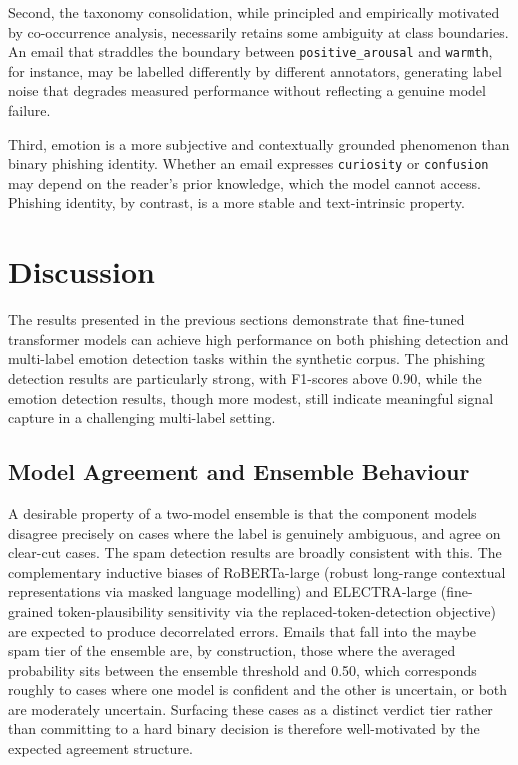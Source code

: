 Second, the taxonomy consolidation, while principled and empirically motivated by co-occurrence analysis, necessarily retains some ambiguity at class boundaries. An email that straddles the boundary between \texttt{positive\_arousal} and \texttt{warmth}, for instance, may be labelled differently by different annotators, generating label noise that degrades measured performance without reflecting a genuine model failure.

Third, emotion is a more subjective and contextually grounded phenomenon than binary phishing identity. Whether an email expresses \texttt{curiosity} or \texttt{confusion} may depend on the reader's prior knowledge, which the model cannot access. Phishing identity, by contrast, is a more stable and text-intrinsic property.

\section{Discussion}
\label{sec:results_discussion}

The results presented in the previous sections demonstrate that fine-tuned transformer models can achieve high performance on both phishing detection and multi-label emotion detection tasks within the synthetic corpus. The phishing detection results are particularly strong, with F1-scores above 0.90, while the emotion detection results, though more modest, still indicate meaningful signal capture in a challenging multi-label setting.

\subsection{Model Agreement and Ensemble Behaviour}

A desirable property of a two-model ensemble is that the component models disagree precisely on cases where the label is genuinely ambiguous, and agree on clear-cut cases. The spam detection results are broadly consistent with this. The complementary inductive biases of \acs{RoBERTa}-large (robust long-range contextual representations via masked language modelling) and \acs{ELECTRA}-large (fine-grained token-plausibility sensitivity via the replaced-token-detection objective) are expected to produce decorrelated errors. Emails that fall into the maybe spam tier of the ensemble are, by construction, those where the averaged probability sits between the ensemble threshold and 0.50, which corresponds roughly to cases where one model is confident and the other is uncertain, or both are moderately uncertain. Surfacing these cases as a distinct verdict tier rather than committing to a hard binary decision is therefore well-motivated by the expected agreement structure.


